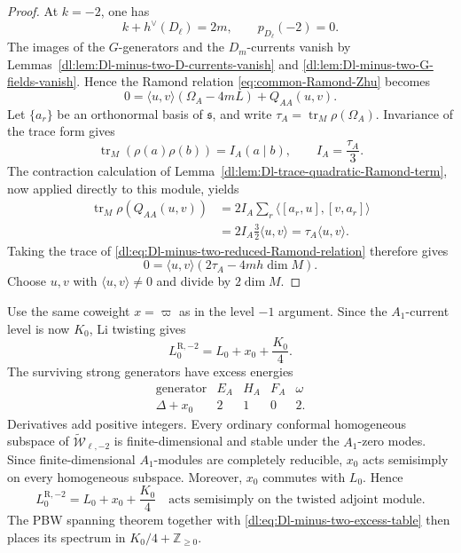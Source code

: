 \documentclass[11pt,reqno]{amsart}
\theoremstyle{definition}
\theoremstyle{remark}
\begin{document}
\begin{proof}
At \(k=-2\), one has
\[
  k+h^\vee(D_\ell)=2m,
  \qquad
  p_{D_\ell}(-2)=0.
\]
The images of the \(G\)-generators and the \(D_m\)-currents vanish by
Lemmas~\ref{dl:lem:Dl-minus-two-D-currents-vanish} and
\ref{dl:lem:Dl-minus-two-G-fields-vanish}.  Hence the Ramond relation
\eqref{eq:common-Ramond-Zhu} becomes
\begin{equation}
  0
  =
  \langle u,v\rangle(\Omega_A-4mL)
  +Q_{AA}(u,v).
  \label{dl:eq:Dl-minus-two-reduced-Ramond-relation}
\end{equation}
Let \(\{a_r\}\) be an orthonormal basis of \(\mathfrak s\), and
write \(\tau_A=\operatorname{tr}_M\rho(\Omega_A)\).  Invariance of
the trace form gives
\[
  \operatorname{tr}_M(\rho(a)\rho(b))
  =
  I_A(a\mid b),
  \qquad
  I_A=\frac{\tau_A}{3}.
\]
The contraction calculation of
Lemma~\ref{dl:lem:Dl-trace-quadratic-Ramond-term}, now applied directly to
this module, yields
\begin{align*}
  \operatorname{tr}_M\rho(Q_{AA}(u,v))
  &=
  2I_A\sum_r
  \langle[a_r,u],[v,a_r]\rangle\\
  &=
  2I_A\frac32\langle u,v\rangle
  =
  \tau_A\langle u,v\rangle.
\end{align*}
Taking the trace of
\eqref{dl:eq:Dl-minus-two-reduced-Ramond-relation} therefore gives
\[
  0
  =
  \langle u,v\rangle
  \left(
    2\tau_A-4mh\dim M
  \right).
\]
Choose \(u,v\) with \(\langle u,v\rangle\ne0\) and divide by
\(2\dim M\).
\end{proof}

Use the same coweight \(x=\varpi\) as in the level \(-1\) argument.  Since the
\(A_1\)-current level is now \(K_0\), Li twisting gives
\begin{equation*}
  L_0^{\mathrm R,-2}
  =
  L_0+x_0+\frac{K_0}{4}.
\end{equation*}
The surviving strong generators have excess energies
\begin{equation}
\begin{array}{c|cccc}
  \text{generator}&E_A&H_A&F_A&\omega\\ \hline
  \Delta+x_0&2&1&0&2.
\end{array}
\label{dl:eq:Dl-minus-two-excess-table}
\end{equation}
Derivatives add positive integers.  Every ordinary conformal
homogeneous subspace of \(\widetilde{\mathcal W}_{\ell,-2}\) is
finite-dimensional and stable under the \(A_1\)-zero modes.  Since
finite-dimensional \(A_1\)-modules are completely reducible, \(x_0\)
acts semisimply on every homogeneous subspace.  Moreover, \(x_0\)
commutes with \(L_0\).  Hence
\begin{equation*}
  L_0^{\mathrm R,-2}
  =
  L_0+x_0+\frac{K_0}{4}
  \quad\text{acts semisimply on the twisted adjoint module.}
\end{equation*}
The PBW spanning theorem together with
\eqref{dl:eq:Dl-minus-two-excess-table} then places its spectrum in
\(K_0/4+\mathbb Z_{\ge0}\).
\end{document}

